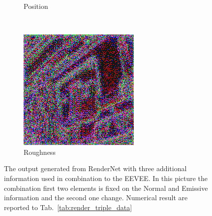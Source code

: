 \begin{figure}[h!]
\begin{subfigure}[b]{0.175\textwidth}
     \caption{Position}
    \end{subfigure}
    ~
    \begin{subfigure}[b]{0.175\textwidth}
     \includegraphics[width=\textwidth]{figures/result/triple/normal_emissive_roughness/3.png}
     \caption{Roughness}
    \end{subfigure}
    \caption{The output generated from RenderNet with three additional information used in combination to the EEVEE. In this picture the combination first two elements is fixed on the Normal and Emissive information and the second one change. Numerical result are reported to Tab.~\ref{tab:render_triple_data}}
    \label{fig:triple_input_base_normal_emissive}
\end{figure}

